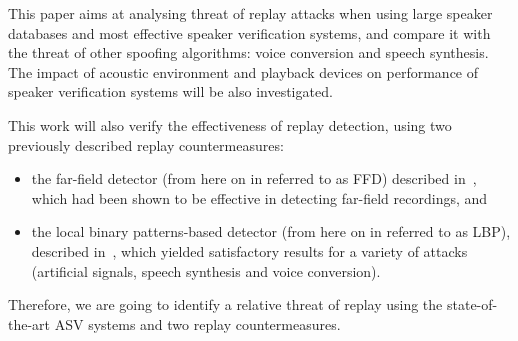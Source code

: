 This paper aims at analysing threat of replay attacks when using large speaker databases and most effective speaker verification systems, and compare it with the threat of other spoofing algorithms: voice conversion and speech synthesis. The impact of acoustic environment and playback devices on performance of speaker verification systems will be also investigated. 

This work will also verify the effectiveness of replay detection, using two previously described replay countermeasures: 
\begin{itemize}
\item the far-field detector (from here on in referred to as FFD) described in~\cite{Villalba2011}, which had been shown to be effective in detecting far-field recordings, and 
\item the local binary patterns-based detector (from here on in referred to as LBP), described in~\cite{Alegre2013a}, which yielded satisfactory results for a variety of attacks (artificial signals, speech synthesis and voice conversion).
\end{itemize}
Therefore, we are going to identify a relative threat of replay using the state-of-the-art ASV systems and two replay countermeasures.